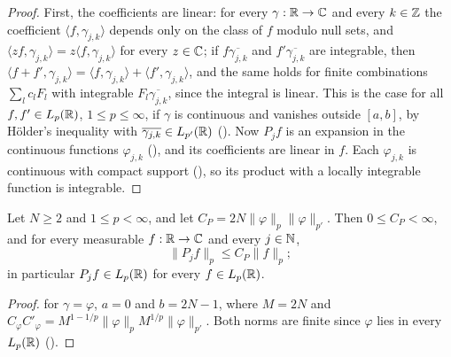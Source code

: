 \begin{proof}
\leanok
{}
First, the coefficients are linear: for every $\gamma : \mathbb{R} \to \mathbb{C}$ and every $k \in \mathbb{Z}$ the
coefficient $\langle f, \gamma_{j,k} \rangle$ depends only on the class of $f$ modulo null sets,
and $\langle z f, \gamma_{j,k} \rangle = z \langle f, \gamma_{j,k} \rangle$ for every $z \in \mathbb{C}$;
if $f \overline{\gamma_{j,k}}$ and $f' \overline{\gamma_{j,k}}$ are integrable, then
$\langle f + f', \gamma_{j,k} \rangle = \langle f, \gamma_{j,k} \rangle
+ \langle f', \gamma_{j,k} \rangle$, and the same holds for finite combinations
$\sum_l c_l F_l$ with integrable $F_l \overline{\gamma_{j,k}}$, since the integral is linear.
This is the case for all
$f, f' \in L_p(\mathbb{R})$, $1 \leq p \leq \infty$, if $\gamma$ is continuous and vanishes outside
$[a, b]$, by H\"older's inequality with $\overline{\gamma_{j,k}} \in L_{p'}(\mathbb{R})$
(). Now $P_j f$ is an expansion in the continuous functions
$\varphi_{j,k}$ (), and its coefficients are linear in $f$. Each
$\varphi_{j,k}$ is continuous with compact support (), so its
product with a locally integrable function is integrable.
\end{proof}

\begin{theorem}
\label{thm:daub-proj-bound}
\leanok
{}
Let $N \geq 2$ and $1 \leq p < \infty$, and let $C_P = 2N \|\varphi\|_p \|\varphi\|_{p'}$. Then
$0 \leq C_P < \infty$, and for every measurable $f : \mathbb{R} \to \mathbb{C}$ and every $j \in \mathbb{N}$,
\[
  \|P_j f\|_p \leq C_P \|f\|_p ;
\]
in particular $P_j f \in L_p(\mathbb{R})$ for every $f \in L_p(\mathbb{R})$.
\end{theorem}

\begin{proof}
\leanok
{}
 for $\gamma = \varphi$, $a = 0$ and $b = 2N - 1$, where $M = 2N$
and $C_\varphi C'_\varphi = M^{1 - 1/p} \|\varphi\|_p M^{1/p} \|\varphi\|_{p'}$. Both norms are
finite since $\varphi$ lies in every $L_p(\mathbb{R})$ ().
\end{proof}

